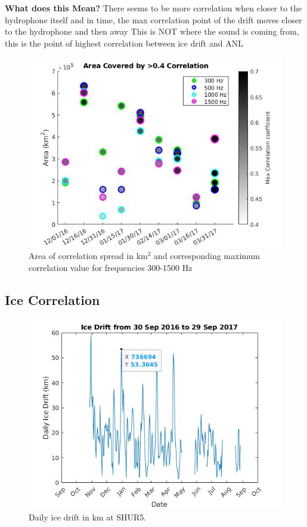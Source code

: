 \textbf{What does this Mean?}
There seems to be more correlation when closer to the hydrophone itself and in time, the max correlation point of the drift moves closer to the hydrophone and then away
This is NOT where the sound is coming from, this is the point of highest correlation between ice drift and ANL

\begin{figure}[h]
\centering
\includegraphics[scale=0.5]{Figures/area_cov_time_corrr.jpg}
\caption{Area of correlation spread in km$^{2}$ and corresponding maximum correlation value for frequencies 300-1500 Hz}
\label{fig_maxcorr_dist}
\end{figure}

\subsection{Ice Correlation}

\begin{figure}[h]
\centering
\includegraphics[scale=0.5]{Figures/sep2016_sep2017_drift.jpg}
\caption{Daily ice drift in km at SHUR5.}
\label{fig_totalice}
\end{figure}


